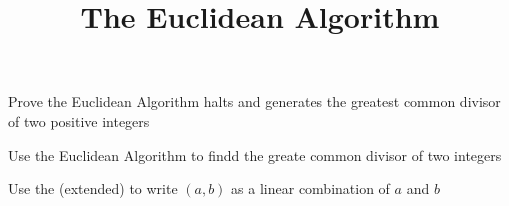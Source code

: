 \documentclass{../ximera}
\title{The Euclidean Algorithm}
\begin{document}
\begin{abstract}
\end{abstract}
\maketitle


\begin{obj}
	\item Prove the Euclidean Algorithm halts and generates the greatest common divisor of two positive integers
	\item Use the Euclidean Algorithm to findd the greate common divisor of two integers
	\item  Use the (extended)  to write $(a,b)$ as a linear combination of $a$ and $b$
\end{obj}





		
\end{document}
